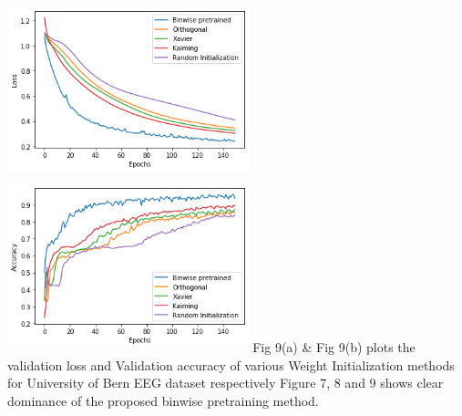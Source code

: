 \documentclass{article}
\begin{document}
\\
\includegraphics[width= 7cm, height=5cm]{fig3.png}
\includegraphics[width= 7cm, height=5cm]{fig4.png}
Fig 9(a) \& Fig 9(b) plots the validation loss and Validation accuracy of various Weight Initialization methods for University of Bern EEG dataset respectively
Figure 7, 8 and 9 shows clear dominance of the proposed binwise pretraining method.
\end{document}

